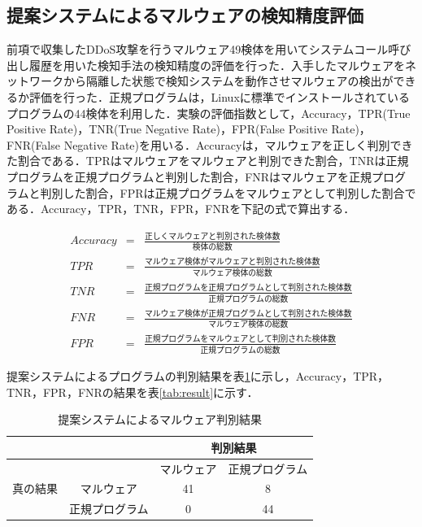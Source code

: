 \subsection{提案システムによるマルウェアの検知精度評価}
前項で収集したDDoS攻撃を行うマルウェア49検体を用いてシステムコール呼び出し履歴を用いた検知手法の検知精度の評価を行った．入手したマルウェアをネットワークから隔離した状態で検知システムを動作させマルウェアの検出ができるか評価を行った．正規プログラムは，Linuxに標準でインストールされているプログラムの44検体を利用した．実験の評価指数として，Accuracy，TPR(True Positive Rate)，TNR(True Negative Rate)，FPR(False Positive Rate)，FNR(False Negative Rate)を用いる．Accuracyは，マルウェアを正しく判別できた割合である．TPRはマルウェアをマルウェアと判別できた割合，TNRは正規プログラムを正規プログラムと判別した割合，FNRはマルウェアを正規プログラムと判別した割合，FPRは正規プログラムをマルウェアとして判別した割合である．Accuracy，TPR，TNR，FPR，FNRを下記の式で算出する．

\begin{eqnarray}
    Accuracy & = & \frac{正しくマルウェアと判別された検体数}{検体の総数}\\
    TPR & = & \frac{マルウェア検体がマルウェアと判別された検体数}{マルウェア検体の総数}\\
    TNR & = & \frac{正規プログラムを正規プログラムとして判別された検体数}{正規プログラムの総数}\\
    FNR & = & \frac{マルウェア検体が正規プログラムとして判別された検体数}{マルウェア検体の総数}\\ 
    FPR & = & \frac{正規プログラムをマルウェアとして判別された検体数}{正規プログラムの総数}
\end{eqnarray}

提案システムによるプログラムの判別結果を表\ref{tab:detect}に示し，Accuracy，TPR，TNR，FPR，FNRの結果を表\ref{tab:result}に示す．

\begin{table}[h]
    \centering
    \caption{提案システムによるマルウェア判別結果}
    \label{tab:detect}
\begin{tabular}[t]{|l|c|c|c|}
    \hline
            &  &  \multicolumn{2}{c|}{判別結果}  \\ \hline 
            &  &  マルウェア & 正規プログラム \\ \hline 
       真の結果 & マルウェア & 41 & 8 \\ \hline
            & 正規プログラム & 0 & 44 \\ \hline
\end{tabular}
\end{table}

